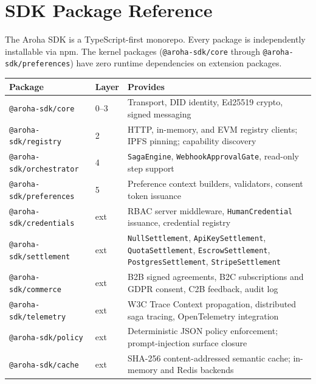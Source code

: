 \documentclass[11pt,a4paper]{article}
\begin{document}
\section{SDK Package Reference}

The Aroha SDK is a TypeScript-first monorepo. Every package is independently
installable via npm. The kernel packages (\texttt{@aroha-sdk/core} through
\texttt{@aroha-sdk/preferences}) have zero runtime dependencies on extension packages.

\begin{table}[ht]
  \centering
  \renewcommand{\arraystretch}{1.4}
  \begin{tabularx}{\textwidth}{@{} l l X @{}}
    \toprule
    \textbf{Package} & \textbf{Layer} & \textbf{Provides} \\
    \midrule
    \texttt{@aroha-sdk/core}             & 0--3 & Transport, DID identity, Ed25519 crypto, signed messaging \\
    \texttt{@aroha-sdk/registry}         & 2    & HTTP, in-memory, and EVM registry clients; IPFS pinning; capability discovery \\
    \texttt{@aroha-sdk/orchestrator}     & 4    & \texttt{SagaEngine}, \texttt{WebhookApprovalGate}, read-only step support \\
    \texttt{@aroha-sdk/preferences}      & 5    & Preference context builders, validators, consent token issuance \\
    \texttt{@aroha-sdk/credentials}      & ext  & RBAC server middleware, \texttt{HumanCredential} issuance, credential registry \\
    \texttt{@aroha-sdk/settlement}       & ext  & \texttt{NullSettlement}, \texttt{ApiKeySettlement}, \texttt{QuotaSettlement}, \texttt{EscrowSettlement}, \texttt{PostgresSettlement}, \texttt{StripeSettlement} \\
    \texttt{@aroha-sdk/commerce}         & ext  & B2B signed agreements, B2C subscriptions and GDPR consent, C2B feedback, audit log \\
    \texttt{@aroha-sdk/telemetry}        & ext  & W3C Trace Context propagation, distributed saga tracing, OpenTelemetry integration \\
    \texttt{@aroha-sdk/policy}           & ext  & Deterministic JSON policy enforcement; prompt-injection surface closure \\
    \texttt{@aroha-sdk/cache}            & ext  & SHA-256 content-addressed semantic cache; in-memory and Redis backends \\

\end{tabularx}
\end{table}
\end{document}
